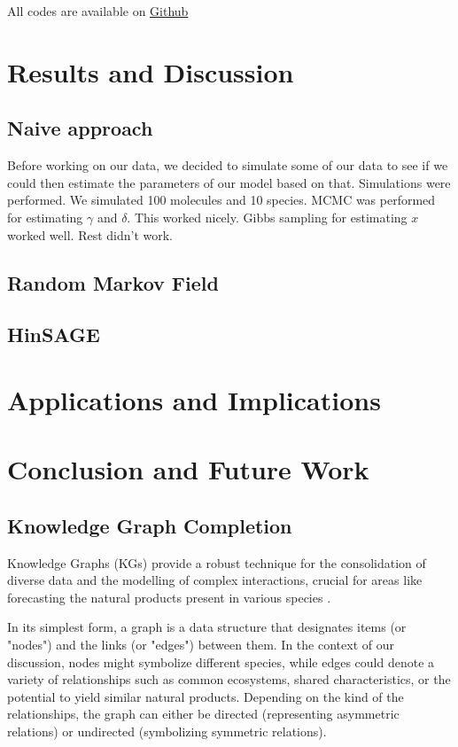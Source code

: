 \documentclass[
11pt, %
english, %
singlespacing, %
headsepline, %
chapterinoneline, %
]{MastersDoctoralThesis} %
\begin{document}
All codes are available on \href{https://github.com/anticipated-lotus/GNN}{Github}


\chapter{Results and Discussion}
\section{Naive approach}
Before working on our data, we decided to simulate some of our data to see if we could then estimate the parameters of our model based on that. Simulations were performed. We simulated 100 molecules and 10 species. MCMC was performed for estimating $\gamma$ and $\delta$. This worked nicely. Gibbs sampling for estimating $x$ worked well. Rest didn't work. 

\section{Random Markov Field}

\section{HinSAGE}



\chapter{Applications and Implications}


\chapter{Conclusion and Future Work}
\section{Knowledge Graph Completion}
Knowledge Graphs (KGs) provide a robust technique for the consolidation of diverse data and the modelling of complex interactions, crucial for areas like forecasting the natural products present in various species \cite{ehrlingerDefinitionKnowledgeGraphs2016}. 

In its simplest form, a graph is a data structure that designates items (or "nodes") and the links (or "edges") between them. In the context of our discussion, nodes might symbolize different species, while edges could denote a variety of relationships such as common ecosystems, shared characteristics, or the potential to yield similar natural products. Depending on the kind of the relationships, the graph can either be directed (representing asymmetric relations) or undirected (symbolizing symmetric relations).
\end{document}
